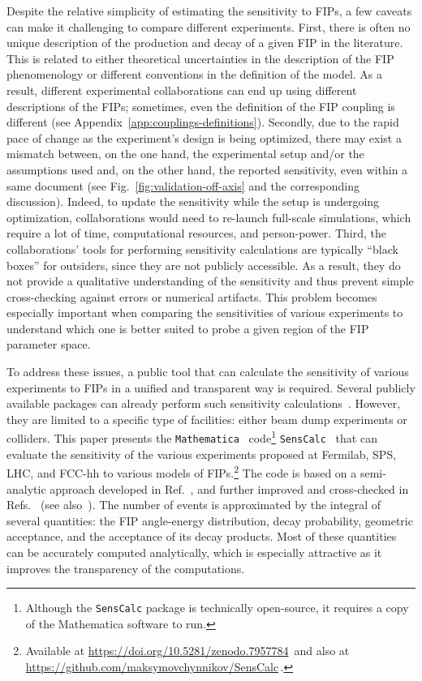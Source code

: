 \documentclass[
    aps,prd,
    twocolumn,
    nofootinbib,
    superscriptaddress,
]{revtex4}
\begin{document}
Despite the relative simplicity of estimating the sensitivity to FIPs, a few caveats can make it challenging to compare different experiments. First, there is often no unique description of the production and decay of a given FIP in the literature. This is related to either theoretical uncertainties in the description of the FIP phenomenology or different conventions in the definition of the model. As a result, different experimental collaborations can end up using different descriptions of the FIPs; sometimes, even the definition of the FIP coupling is different (see Appendix~\ref{app:couplings-definitions}). Secondly, due to the rapid pace of change as the experiment's design is being optimized, there may exist a mismatch between, on the one hand, the experimental setup and/or the assumptions used and, on the other hand, the reported sensitivity, even within a same document (see Fig.~\ref{fig:validation-off-axis} and the corresponding discussion). Indeed, to update the sensitivity while the setup is undergoing optimization, collaborations would need to re-launch full-scale simulations, which require a lot of time, computational resources, and person-power. Third, the collaborations' tools for performing sensitivity calculations are typically ``black boxes'' for outsiders, since they are not publicly accessible. As a result, they do not provide a qualitative understanding of the sensitivity and thus prevent simple cross-checking against errors or numerical artifacts. This problem becomes especially important when comparing the sensitivities of various experiments to understand which one is better suited to probe a given region of the FIP parameter space.

To address these issues, a public tool that can calculate the sensitivity of various experiments to FIPs in a unified and transparent way is required. Several publicly available packages can already perform such sensitivity calculations~\cite{Kling:2021fwx,Jerhot:2022chi}. However, they are limited to a specific type of facilities: either beam dump experiments or colliders. This paper presents the \texttt{Mathematica}~\cite{Mathematica} code\footnote{Although the \texttt{SensCalc} package is technically open-source, it requires a copy of the Mathematica software to run.} \texttt{SensCalc}~\cite{SensCalc-Zenodo} that can evaluate the sensitivity of the various experiments proposed at Fermilab, SPS, LHC, and FCC-hh to various models of FIPs.\footnote{Available at \url{https://doi.org/10.5281/zenodo.7957784}\, and also at \url{https://github.com/maksymovchynnikov/SensCalc}\,.} The code is based on a semi-analytic approach developed in Ref.~\cite{Bondarenko:2019yob}, and further improved and cross-checked in Refs.~\cite{Boiarska:2021yho,Boyarsky:2022epg,Ovchynnikov:2022its} (see also~\cite{Coloma:2023adi,Batell:2023mdn}). The number of events is approximated by the integral of several quantities: the FIP angle-energy distribution, decay probability, geometric acceptance, and the acceptance of its decay products. Most of these quantities can be accurately computed analytically, which is especially attractive as it improves the transparency of the computations.
\end{document}
